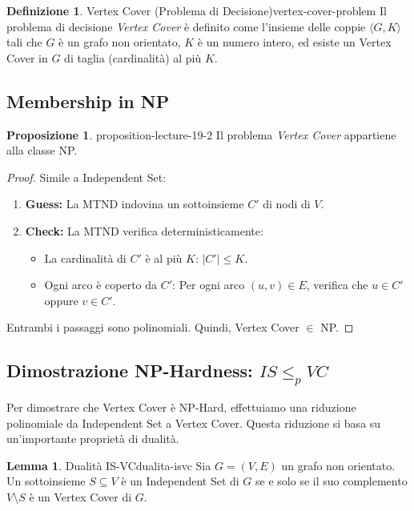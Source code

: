 \documentclass[a4paper]{article}
\theoremstyle{definition} %
\newtheorem{definition}{Definizione}[section]
\newtheorem{lemma}{Lemma}[section]
\newtheorem{proposition}{Proposizione}[section]
\theoremstyle{definition} %
\begin{document}
\begin{definition}{Vertex Cover (Problema di Decisione)}{vertex-cover-problem}
Il problema di decisione \emph{Vertex Cover} è definito come l'insieme delle coppie $\langle G, K \rangle$ tali che $G$ è un grafo non orientato, $K$ è un numero intero, ed esiste un Vertex Cover in $G$ di taglia (cardinalità) al più $K$.
\end{definition}

\subsection{Membership in NP}

\begin{proposition}{}{{ proposition-lecture-19-2 }}
Il problema \emph{Vertex Cover} appartiene alla classe NP.
\end{proposition}

\begin{proof}
Simile a Independent Set:
\begin{enumerate}
    \item \textbf{Guess:} La MTND indovina un sottoinsieme $C'$ di nodi di $V$.
    \item \textbf{Check:} La MTND verifica deterministicamente:
    \begin{itemize}
        \item La cardinalità di $C'$ è al più $K$: $|C'| \le K$.
        \item Ogni arco è coperto da $C'$: Per ogni arco $(u, v) \in E$, verifica che $u \in C'$ oppure $v \in C'$.
    \end{itemize}
\end{enumerate}
Entrambi i passaggi sono polinomiali. Quindi, Vertex Cover $\in$ NP.
\end{proof}

\subsection{Dimostrazione NP-Hardness: $IS \le_p VC$}

Per dimostrare che Vertex Cover è NP-Hard, effettuiamo una riduzione polinomiale da Independent Set a Vertex Cover. Questa riduzione si basa su un'importante proprietà di dualità.

\begin{lemma}{Dualità IS-VC}{dualita-isvc}
Sia $G=(V, E)$ un grafo non orientato. Un sottoinsieme $S \subseteq V$ è un Independent Set di $G$ se e solo se il suo complemento $V \setminus S$ è un Vertex Cover di $G$.
\end{lemma}
\end{document}

